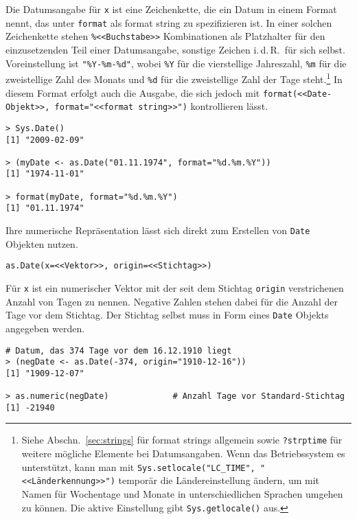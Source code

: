 Die Datumsangabe für \lstinline!x! ist eine Zeichenkette, die ein Datum in einem Format nennt, das unter \lstinline!format! als format string zu spezifizieren ist. In einer solchen Zeichenkette stehen \lstinline!%<<Buchstabe>>! Kombinationen als Platzhalter für den einzusetzenden Teil einer Datumsangabe, sonstige Zeichen i.\,d.\,R.\ für sich selbst. Voreinstellung ist \lstinline!"%Y-%m-%d"!, wobei \lstinline!%Y! für die vierstellige Jahreszahl, \lstinline!%m! für die zweistellige Zahl des Monats und \lstinline!%d! für die zweistellige Zahl der Tage steht.\footnote{\label{ftn:dateFormat}Siehe Abschn.\ \ref{sec:strings} für format strings allgemein sowie \lstinline!?strptime! für weitere mögliche Elemente bei Datumsangaben. Wenn das Betriebssystem es unterstützt, kann man mit \lstinline!Sys.setlocale("LC_TIME", "<<Länderkennung>>")! temporär die Ländereinstellung ändern, um mit Namen für Wochentage und Monate in unterschiedlichen Sprachen umgehen zu können. Die aktive Einstellung gibt  \lstinline!Sys.getlocale()! aus.} In diesem Format erfolgt auch die Ausgabe, die sich jedoch mit \lstinline!format(<<Date-Objekt>>, format="<<format string>>")! kontrollieren lässt.
\begin{lstlisting}
> Sys.Date()
[1] "2009-02-09"

> (myDate <- as.Date("01.11.1974", format="%d.%m.%Y"))
[1] "1974-11-01"

> format(myDate, format="%d.%m.%Y")
[1] "01.11.1974"
\end{lstlisting}

Ihre numerische Repräsentation lässt sich direkt zum Erstellen von \lstinline!Date! Objekten nutzen.
\begin{lstlisting}
as.Date(x=<<Vektor>>, origin=<<Stichtag>>)
\end{lstlisting}

Für \lstinline!x! ist ein numerischer Vektor mit der seit dem Stichtag \lstinline!origin! verstrichenen Anzahl von Tagen zu nennen. Negative Zahlen stehen dabei für die Anzahl der Tage vor dem Stichtag. Der Stichtag selbst muss in Form eines \lstinline!Date! Objekts angegeben werden.
\begin{lstlisting}
# Datum, das 374 Tage vor dem 16.12.1910 liegt
> (negDate <- as.Date(-374, origin="1910-12-16"))
[1] "1909-12-07"

> as.numeric(negDate)             # Anzahl Tage vor Standard-Stichtag
[1] -21940
\end{lstlisting}

